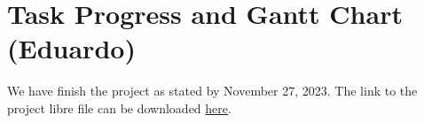 \section{Task Progress and Gantt Chart (Eduardo)}
We have finish the project as stated by November 27, 2023.
The link to the project libre file can be downloaded \href{https://github.com/fabiomatos999/M.O.S.I.S/blob/capstone/Proposal%20Report/Project%20Schedule/M.O.S.I.S%20UI%202.0%20Schedule.pod}{here}.

